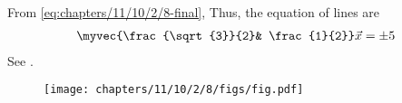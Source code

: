 			From 
\eqref{eq:chapters/11/10/2/8-final},
		Thus, the equation of lines are
\begin{align}
	\myvec{\frac{\sqrt{3}}{2}& \frac{1}{2}}\vec{x}=\pm5
\end{align}
See 
.
\begin{figure}[H]
\begin{center}
\texttt{[image: chapters/11/10/2/8/figs/fig.pdf]}
\end{center}
\caption{}
\label{fig:chapters/11/10/2/8/Fig1}
\end{figure}
